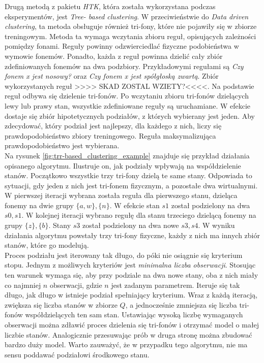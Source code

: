 \documentclass[11pt]{article}
\begin{document}
	Drugą metodą z pakietu \textit{HTK}, która została wykorzystana podczas eksperymentów, jest \textit{Tree- based clustering}. W przeciwieństwie do \textit{Data driven clustering}, ta metoda obsługuje również tri-fony, które nie pojawiły się w zbiorze treningowym. Metoda ta wymaga wczytania zbioru reguł, opisujących zależności pomiędzy fonami. Reguły powinny odzwierciedlać fizyczne podobieństwa w wymowie fonemów. Ponadto, każda z reguł powinna dzielić cały zbiór zdefiniowanych fonemów na dwa podzbiory. Przykładowymi regułami są \textit{Czy fonem x jest nosowy?} oraz \textit{Czy fonem x jest spółgłoską zwartą}. Zbiór wykorzystanych reguł >>>> SKAD ZOSTAL WZIETY?<<<<.  Na podstawie reguł odbywa się dzielenie tri-fonów. Po wczytaniu zbioru tri-fonów dzielących lewy lub prawy stan, wszystkie zdefiniowane reguły są uruchamiane. W efekcie dostaje się zbiór hipotetycznych podziałów, z których wybierany jest jeden. Aby zdecydować, który podział jest najlepszy, dla każdego z nich, liczy się prawdopodobieństwo zbiory treningowego. Reguła maksymalizująca prawdopodobieństwo jest wybierana. \\
	Na rysunek \ref{fig:trr-based_clustering_example} znajduje się przykład działania opisanego algorytmu. Ilustruje on, jak podziały wpływają na współdzielenie stanów. Początkowo wszystkie trzy tri-fony dzielą te same stany. Odpowiada to sytuacji, gdy jeden z nich jest tri-fonem fizycznym, a pozostałe dwa wirtualnymi. W pierwszej iteracji wybrana została reguła dla pierwszego stanu, dzieląca fonemy na dwie grupy $\{a,w\},\{n\}$. W efekcie stan $s1$ został podzielony na dwa $s0,s1$. W kolejnej iteracji wybrano regułę dla stanu trzeciego dzielącą fonemy na grupy $\{z\},\{b\}$. Stany $s3$ został podzielony na dwa nowe $s3,s4$. W wyniku działania algorytmu powstały trzy tri-fony fizyczne, każdy z nich ma innych zbiór stanów, które go modelują.\\
	Proces podziału jest iterowany tak długo, do póki nie osiągnie się kryterium stopu. Jednym z możliwych kryteriów jest \textit{minimalna liczba obserwacji}. Stosując ten warunek wymaga się, aby przy podziale na dwa nowe stany, oba z nich miały co najmniej $n$ obserwacji, gdzie $n$ jest zadanym parametrem. Iteruje się tak długo, jak długo w istnieje podział spełniający kryterium. Wraz z każdą iteracją, zwiększa się liczba stanów w zbiorze $Q$, a jednocześnie zmniejsza się liczba tri-fonów współdzielących ten sam stan. Ustawiając wysoką liczbę wymaganych obserwacji można zdławić proces dzielenia się tri-fonów i otrzymać model o małej liczbie stanów. Analogicznie przesuwając prób w druga stronę można zbudować bardzo duży model. Warto zauważyć, że w przypadku tego algorytmu, nie ma sensu poddawać podziałowi środkowego stanu.  \\
\end{document}
